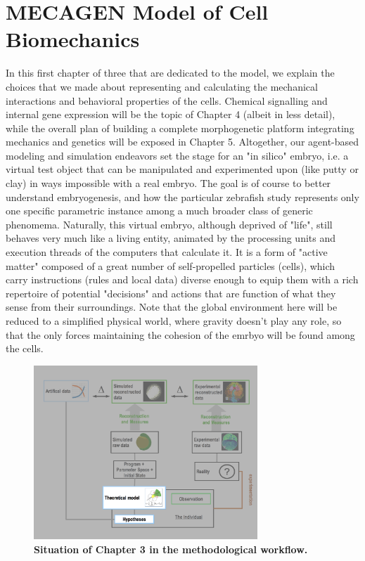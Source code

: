 


\section{MECAGEN Model of Cell Biomechanics}


In this first chapter of three that are dedicated to the model, we explain the choices that we made about representing and calculating the mechanical interactions and behavioral properties of the cells. Chemical signalling and internal gene expression will be the topic of Chapter 4 (albeit in less detail), while the overall plan of building a complete morphogenetic platform integrating mechanics and genetics will be exposed in Chapter 5. Altogether, our agent-based modeling and simulation endeavors set the stage for an "in silico" embryo, i.e. a virtual test object that can be manipulated and experimented upon (like putty or clay) in ways impossible with a real embryo. The goal is of course to better understand embryogenesis, and how the particular zebrafish study represents only one specific parametric instance among a much broader class of generic phenomema. Naturally, this virtual embryo, although deprived of "life", still behaves very much like a living entity, animated by the processing units and execution threads of the computers that calculate it. It is a form of "active matter" composed of a great number of self-propelled particles (cells), which carry instructions (rules and local data) diverse enough to equip them with a rich repertoire of potential "decisions" and actions that are function of what they sense from their surroundings. Note that the global environment here will be reduced to a simplified physical world, where gravity doesn't play any role, so that the only forces maintaining the cohesion of the emrbyo will be found among the cells.
\begin{figure}
\begin{center}
\includegraphics[width=0.75\textwidth]{../../images/experimental_science/experimental_science_cleaner_focus_theo.png}
\end{center}
\caption{\textbf{Situation of Chapter 3 in the methodological workflow.}}
\label{experimental_science_experimental_science_cleaner_focus_theo}
\end{figure}


